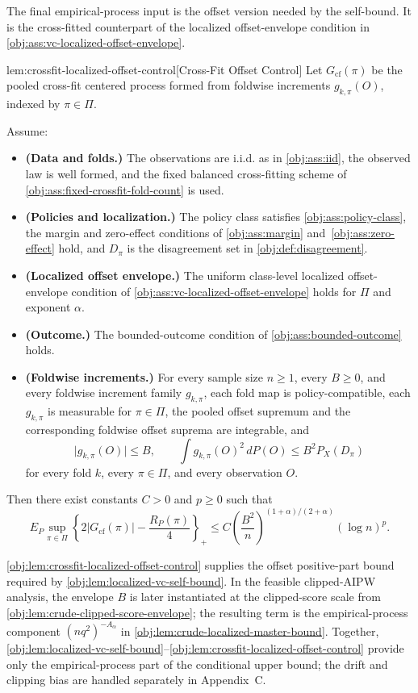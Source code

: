 The final empirical-process input is the offset version needed by the self-bound.  It is the cross-fitted counterpart of the localized offset-envelope condition in \cref{obj:ass:vc-localized-offset-envelope}.

\begin{lemmav}{lem:crossfit-localized-offset-control}[Cross-Fit Offset Control]
Let \(G_{\mathrm{cf}}(\pi)\) be the pooled cross-fit centered process formed from foldwise increments \(g_{k,\pi}(O)\), indexed by \(\pi\in\Pi\).

Assume:
\begin{itemize}
\item \textbf{(Data and folds.)} The observations are i.i.d. as in \cref{obj:ass:iid}, the observed law is well formed, and the fixed balanced cross-fitting scheme of \cref{obj:ass:fixed-crossfit-fold-count} is used.
\item \textbf{(Policies and localization.)} The policy class satisfies \cref{obj:ass:policy-class}, the margin and zero-effect conditions of \cref{obj:ass:margin} and~\cref{obj:ass:zero-effect} hold, and \(D_\pi\) is the disagreement set in \cref{obj:def:disagreement}.
\item \textbf{(Localized offset envelope.)} The uniform class-level localized offset-envelope condition of \cref{obj:ass:vc-localized-offset-envelope} holds for \(\Pi\) and exponent \(\alpha\).
\item \textbf{(Outcome.)} The bounded-outcome condition of \cref{obj:ass:bounded-outcome} holds.
\item \textbf{(Foldwise increments.)} For every sample size \(n\ge1\), every \(B\ge0\), and every foldwise increment family \(g_{k,\pi}\), each fold map is policy-compatible, each \(g_{k,\pi}\) is measurable for \(\pi\in\Pi\), the pooled offset supremum and the corresponding foldwise offset suprema are integrable, and
\[
\lvert g_{k,\pi}(O)\rvert\le B,
\qquad
\int g_{k,\pi}(O)^2\,dP(O)
\le B^2 P_X(D_\pi)
\]
for every fold \(k\), every \(\pi\in\Pi\), and every observation \(O\).
\end{itemize}
Then there exist constants \(C>0\) and \(p\ge0\) such that
\[
E_P \sup_{\pi\in\Pi}
\left\{2\lvert G_{\mathrm{cf}}(\pi)\rvert-\frac{R_P(\pi)}{4}\right\}_{+}
\le
C\left(\frac{B^2}{n}\right)^{(1+\alpha)/(2+\alpha)}(\log n)^p .
\]
\end{lemmav}

\cref{obj:lem:crossfit-localized-offset-control} supplies the offset positive-part bound required by \cref{obj:lem:localized-vc-self-bound}.  In the feasible clipped-AIPW analysis, the envelope \(B\) is later instantiated at the clipped-score scale from \cref{obj:lem:crude-clipped-score-envelope}; the resulting term is the empirical-process component \((nq^2)^{-A_\alpha}\) in \cref{obj:lem:crude-localized-master-bound}.  Together, \cref{obj:lem:localized-vc-self-bound}--\cref{obj:lem:crossfit-localized-offset-control} provide only the empirical-process part of the conditional upper bound; the drift and clipping bias are handled separately in Appendix~C.
